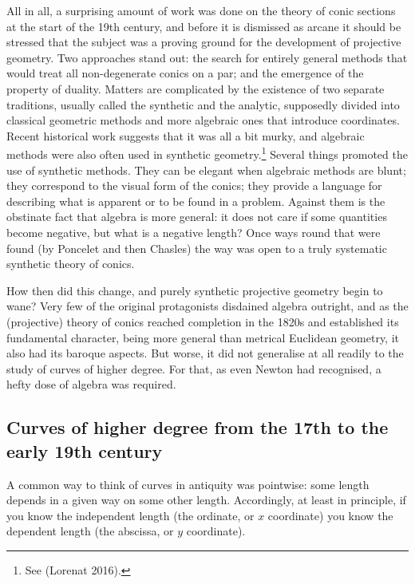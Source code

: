 All in all, a surprising amount of work was done on the theory of conic sections  at the start of the 19th century, and before it is dismissed as arcane it should be stressed that the subject was a proving ground for the development of projective geometry. Two approaches stand out: the search for entirely  general methods that would treat all non-degenerate conics on a par; and the emergence of the property of duality. Matters are complicated by the existence of two separate traditions, usually called the synthetic and the analytic, supposedly divided into classical geometric methods and more algebraic ones that introduce coordinates. 
Recent historical work suggests that it was all a bit murky, and algebraic methods were also often used in synthetic geometry.\footnote{See (Lorenat 2016).} Several things promoted the use of synthetic methods. They can be elegant when algebraic methods are blunt; they correspond to the visual form of the conics; they provide a language for describing what is apparent or to be found in a problem. Against them is the obstinate fact that algebra is more general: it does not care if some quantities become negative, but what is a negative length? Once ways round that were found (by Poncelet and then Chasles) the way was open to a truly systematic synthetic theory of conics.   

How then did this change, and purely synthetic projective geometry begin to wane? Very few of the original protagonists disdained algebra outright, and as the (projective) theory of conics reached completion in the 1820s and established its fundamental character, being more general than metrical Euclidean geometry, it also had its baroque aspects. But worse, it did not generalise at all readily  to the study of curves of higher degree. For that, as even Newton had recognised, a hefty dose of algebra was required.







\subsection{Curves of higher degree from the 17th to the early 19th century} A common way to think of curves in antiquity was pointwise: some length depends in a given way on some other length. Accordingly, at least in principle, if you know the independent length
(the ordinate, or $x$ coordinate) you know the dependent length (the abscissa, or $y$ coordinate).  

